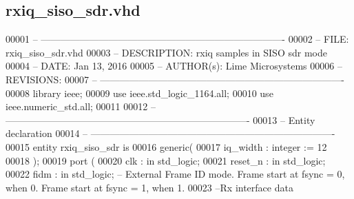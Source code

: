 \subsection{rxiq\+\_\+siso\+\_\+sdr.\+vhd}
\label{rxiq__siso__sdr_8vhd_source}

\begin{DoxyCode}
00001 \textcolor{keyword}{-- ---------------------------------------------------------------------------- }
00002 \textcolor{keyword}{-- FILE:    rxiq\_siso\_sdr.vhd}
00003 \textcolor{keyword}{-- DESCRIPTION: rxiq samples in SISO sdr mode}
00004 \textcolor{keyword}{-- DATE:    Jan 13, 2016}
00005 \textcolor{keyword}{-- AUTHOR(s):   Lime Microsystems}
00006 \textcolor{keyword}{-- REVISIONS:}
00007 \textcolor{keyword}{-- ---------------------------------------------------------------------------- }
00008 \textcolor{vhdlkeyword}{library }\textcolor{keywordflow}{ieee};
00009 \textcolor{vhdlkeyword}{use }ieee.std\_logic\_1164.\textcolor{keywordflow}{all};
00010 \textcolor{vhdlkeyword}{use }ieee.numeric\_std.\textcolor{keywordflow}{all};
00011 
00012 \textcolor{keyword}{-- ----------------------------------------------------------------------------}
00013 \textcolor{keyword}{-- Entity declaration}
00014 \textcolor{keyword}{-- ----------------------------------------------------------------------------}
00015 \textcolor{keywordflow}{entity }rxiq_siso_sdr \textcolor{keywordflow}{is}
00016    \textcolor{keywordflow}{generic}\textcolor{vhdlchar}{(}
00017       \textcolor{vhdlchar}{iq_width}                  \textcolor{vhdlchar}{:} \textcolor{comment}{integer} \textcolor{vhdlchar}{:=} \textcolor{vhdllogic}{}\textcolor{vhdllogic}{12}
00018    \textcolor{vhdlchar}{)};
00019   \textcolor{keywordflow}{port} \textcolor{vhdlchar}{(}
00020       \textcolor{vhdlchar}{clk}         \textcolor{vhdlchar}{:} \textcolor{keywordflow}{in} \textcolor{comment}{std\_logic};
00021       \textcolor{vhdlchar}{reset_n}     \textcolor{vhdlchar}{:} \textcolor{keywordflow}{in} \textcolor{comment}{std\_logic};
00022       \textcolor{vhdlchar}{fidm}         \textcolor{vhdlchar}{:} \textcolor{keywordflow}{in} \textcolor{comment}{std\_logic};\textcolor{keyword}{ -- External Frame ID mode. Frame start at fsync = 0, when 0. Frame start
       at fsync = 1, when 1.}
00023 \textcolor{keyword}{      --Rx interface data }

\end{DoxyCode}
